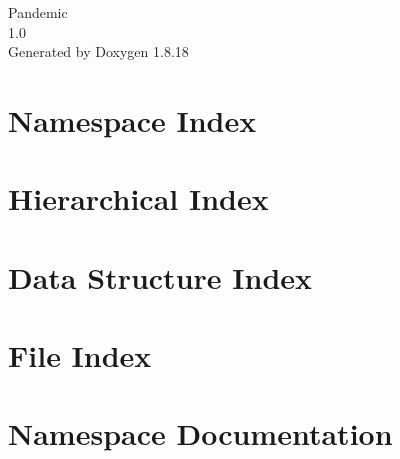 \let\mypdfximage\pdfximage\def\pdfximage{\immediate\mypdfximage}\documentclass[twoside]{book}
\newcommand{\+}{\discretionary{\mbox{\scriptsize$\hookleftarrow$}}{}{}}
\newcommand{\clearemptydoublepage}{%
  \newpage{\pagestyle{empty}\cleardoublepage}%
}
\begin{document}
\hypersetup{pageanchor=false,
             bookmarksnumbered=true,
             pdfencoding=unicode
            }
\begin{titlepage}
\vspace*{7cm}
\begin{center}%
{\Large Pandemic \\[1ex]\large 1.\+0 }\\
\vspace*{1cm}
{\large Generated by Doxygen 1.8.18}\\
\end{center}
\end{titlepage}
\clearemptydoublepage
{}
\tableofcontents
\clearemptydoublepage
{}
\hypersetup{pageanchor=true}

\chapter{Namespace Index}

\chapter{Hierarchical Index}

\chapter{Data Structure Index}

\chapter{File Index}

\chapter{Namespace Documentation}






\end{document}
